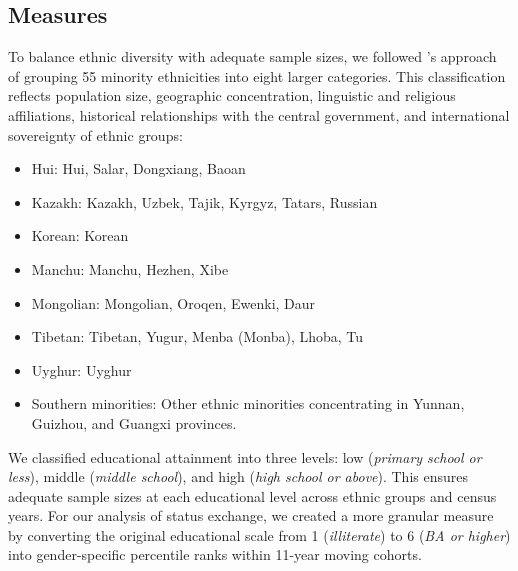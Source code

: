 \subsection{Measures}

To balance ethnic diversity with adequate sample sizes, we followed
\citeauthor{ma_ethnic_2008}'s \citeyear{ma_ethnic_2008} approach of grouping 55
minority ethnicities into eight larger categories.
This classification reflects population size, geographic concentration,
linguistic and religious affiliations, historical relationships with the central
government, and international sovereignty of ethnic groups:

\begin{itemize}
    \item Hui: Hui, Salar, Dongxiang, Baoan
    \item Kazakh: Kazakh, Uzbek, Tajik, Kyrgyz, Tatars, Russian
    \item Korean: Korean
    \item Manchu: Manchu, Hezhen, Xibe
    \item Mongolian: Mongolian, Oroqen, Ewenki, Daur
    \item Tibetan: Tibetan, Yugur, Menba (Monba), Lhoba, Tu
    \item Uyghur: Uyghur
    \item Southern minorities: Other ethnic minorities concentrating in Yunnan, Guizhou,
          and Guangxi provinces.
\end{itemize}

We classified educational attainment into three levels: low
(\textit{primary school or less}), middle (\textit{middle school}), and high
(\textit{high school or above}).
This ensures adequate sample sizes at each educational level across ethnic
groups and census years.
For our analysis of status exchange, we created a more granular measure by
converting the original educational scale from 1 (\textit{illiterate}) to 6
(\textit{BA or higher}) into gender-specific percentile ranks within 11-year
moving cohorts.